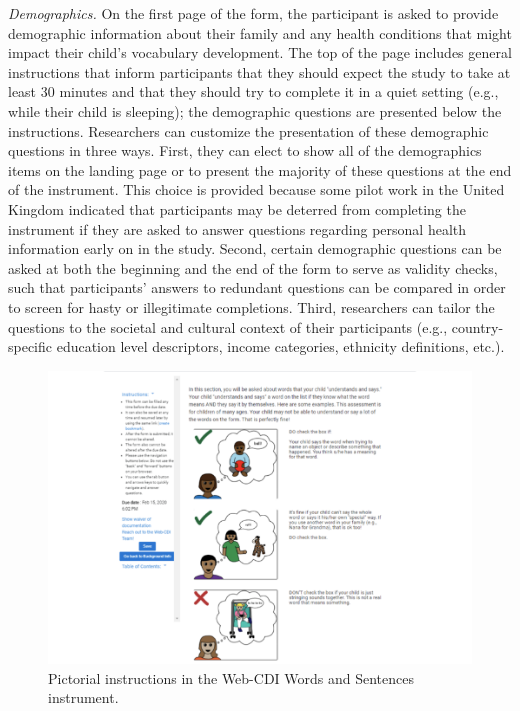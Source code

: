 \documentclass[
  english,
  ,man,floatsintext]{apa6}
\begin{document}
\emph{Demographics.} On the first page of the form, the participant is asked to provide demographic information about their family and any health conditions that might impact their child's vocabulary development. The top of the page includes general instructions that inform participants that they should expect the study to take at least 30 minutes and that they should try to complete it in a quiet setting (e.g., while their child is sleeping); the demographic questions are presented below the instructions. Researchers can customize the presentation of these demographic questions in three ways. First, they can elect to show all of the demographics items on the landing page or to present the majority of these questions at the end of the instrument. This choice is provided because some pilot work in the United Kingdom indicated that participants may be deterred from completing the instrument if they are asked to answer questions regarding personal health information early on in the study. Second, certain demographic questions can be asked at both the beginning and the end of the form to serve as validity checks, such that participants' answers to redundant questions can be compared in order to screen for hasty or illegitimate completions. Third, researchers can tailor the questions to the societal and cultural context of their participants (e.g., country-specific education level descriptors, income categories, ethnicity definitions, etc.).

\begin{figure}
\centering
\includegraphics{webcdi_paper_files/figure-latex/pictorial-1.pdf}
\caption{\label{fig:pictorial}Pictorial instructions in the Web-CDI Words and Sentences instrument.}
\end{figure}
\end{document}
